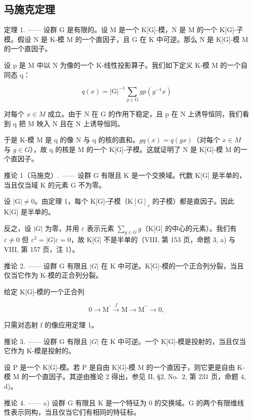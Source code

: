 \subsection{马施克定理}

定理 1. —— 设群 G 是有限的。设 M 是一个 K{[}G{]}-模，N 是 M 的一个 K{[}G{]}-子模。假设 N 是 K-模 M 的一个直因子，且 \textbar G\textbar{} 在 K 中可逆。那么 N 是 K{[}G{]}-模 M 的一个直因子。

设 p 是 M 中以 N 为像的一个 K-线性投影算子。我们如下定义 K-模 M 的一个自同态 q：

\[
q (x) = | \mathrm{G} | ^ {- 1} \sum_ {g \in \mathrm{G}} g p (g ^ {- 1} x)
\]

对每个 \(x \in M\) 成立。由于 N 在 G 的作用下稳定，且 p 在 N 上诱导恒同，我们看到 q 把 M 映入 N 且在 N 上诱导恒同。

于是 K-模 M 是 q 的像 N 与 q 的核的直和。\(g q(x) = q(gx)\)（对每个 \(x \in M\) 与 \(g \in G\)），故 q 的核是 M 的一个 K{[}G{]}-子模。这就证明了 N 是 K{[}G{]}-模 M 的一个直因子。

推论 1（马施克）. —— 设群 G 有限且 K 是一个交换域。代数 K{[}G{]} 是半单的，当且仅当域 K 的元素 \textbar G\textbar{} 不为零。

设 \(|\mathrm{G}| \neq 0\)。由定理 1，每个 K{[}G{]}-子模（\(\mathrm{K}[\mathrm{G}]_s\) 的子模）都是直因子。因此 K{[}G{]} 是半单的。

反之，设 \(|G|\) 为零，并用 \(\varepsilon\) 表示元素 \(\sum_{g\in G} g\)（K{[}G{]} 的中心的元素）。我们有 \(\varepsilon \neq 0\) 但 \(\varepsilon^{2} = |G|\varepsilon = 0\)，故 K{[}G{]} 不是半单的（VIII, 第 153 页，命题 3, a) 与 VIII, 第 157 页，注 1）。

推论 2. —— 设群 G 有限且 \(|G|\) 在 K 中可逆。K{[}G{]}-模的一个正合列分裂，当且仅当它作为 K-模的正合列分裂。

给定 K{[}G{]}-模的一个正合列

\[
0 \longrightarrow \mathrm{M} ^ {\prime} \stackrel {f} {\longrightarrow} \mathrm{M} \longrightarrow \mathrm{M} ^ {\prime \prime} \longrightarrow 0,
\]

只需对态射 f 的像应用定理 1。

推论 3. —— 设群 G 有限且 \(|G|\) 在 K 中可逆。一个 K{[}G{]}-模是投射的，当且仅当它作为 K-模是投射的。

设 P 是一个 K{[}G{]}-模。若 P 是自由 K{[}G{]}-模 M 的一个直因子，则它更是自由 K-模 M 的一个直因子。其逆由推论 2 得出，参见 II, §2, No.~2, 第 231 页，命题 4, d)。

推论 4. —— a) 设群 G 有限且 K 是一个特征为 0 的交换域。G 的两个有限维线性表示同构，当且仅当它们有相同的特征标。

